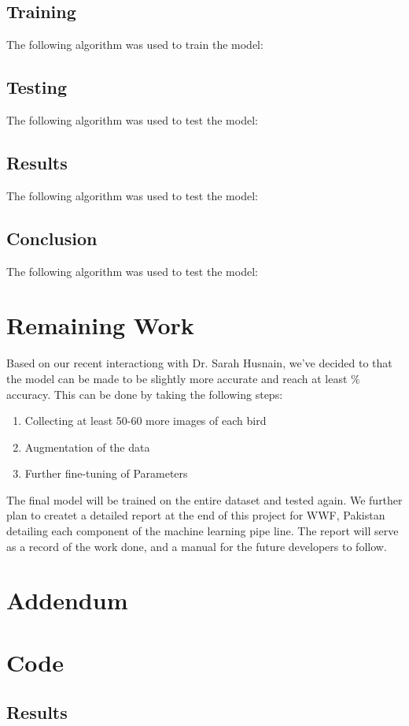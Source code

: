 \documentclass{article}
\begin{document}
    \subsection*{Training}
    The following algorithm was used to train the model:
    

    \subsection*{Testing}
    The following algorithm was used to test the model:
    
    \subsection*{Results}
    The following algorithm was used to test the model:
    
    \subsection*{Conclusion}
    The following algorithm was used to test the model:


    \section*{Remaining Work}
    
    Based on our recent interactiong with Dr. Sarah Husnain, we've decided to that the model can be made to be slightly more accurate and reach at least $\%$ accuracy. This can be done by taking the following steps:
    \begin{enumerate}
        \item Collecting at least 50-60 more images of each bird
        \item Augmentation of the data
        \item Further fine-tuning of Parameters
    \end{enumerate}
    The final model will be trained on the entire dataset and tested again. We further plan to createt a detailed report at the end of this project for WWF, Pakistan detailing each component of the machine learning pipe line. The report will serve as a record of the work done, and a manual for the future developers to follow.
    
    \section*{Addendum}
    \section*{Code}
    \subsection*{Results}
\end{document}
